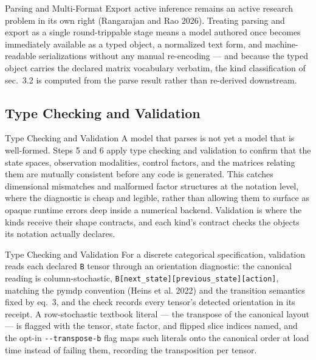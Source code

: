 \documentclass[
  ignorenonframetext,
]{beamer}
\begin{document}
\begin{frame}[allowframebreaks]{Parsing and Multi-Format Export}
active inference remains an active research problem in its own right
(Rangarajan and Rao 2026). Treating parsing and export as a single
round-trippable stage means a model authored once becomes immediately
available as a typed object, a normalized text form, and
machine-readable serializations without any manual re-encoding --- and
because the typed object carries the declared matrix vocabulary
verbatim, the kind classification of sec.~3.2 is
computed from the parse result rather than re-derived downstream.
\end{frame}

\subsection{Type Checking and
Validation}\label{type-checking-and-validation}

\begin{frame}{Type Checking and Validation}
A model that parses is not yet a model that is well-formed. Steps 5 and
6 apply type checking and validation to confirm that the state spaces,
observation modalities, control factors, and the matrices relating them
are mutually consistent before any code is generated. This catches
dimensional mismatches and malformed factor structures at the notation
level, where the diagnostic is cheap and legible, rather than allowing
them to surface as opaque runtime errors deep inside a numerical
backend. Validation is where the kinds receive their shape contracts,
and each kind's contract checks the objects its notation actually
declares.

\end{frame}

\begin{frame}{Type Checking and Validation}
For a discrete categorical specification, validation reads each declared
\texttt{B} tensor through an orientation diagnostic: the canonical
reading is column-stochastic,
\texttt{B{[}next\_state{]}{[}previous\_state{]}{[}action{]}}, matching
the pymdp convention (Heins et al. 2022) and the transition semantics
fixed by eq.~3, and the check records every tensor's
detected orientation in its receipt. A row-stochastic textbook literal
--- the transpose of the canonical layout --- is flagged with the
tensor, state factor, and flipped slice indices named, and the opt-in
\texttt{-\/-transpose-b} flag maps such literals onto the canonical
order at load time instead of failing them, recording the transposition
per tensor.

\end{frame}
\end{document}
